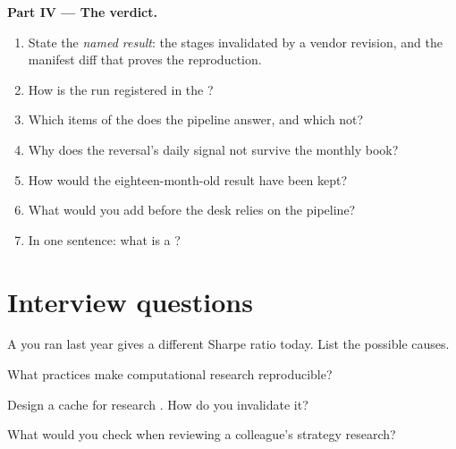 \begin{problem}
\medskip\noindent\textbf{Part IV --- The verdict.}
\begin{enumerate}[resume]
\item State the \emph{named result}: the stages invalidated by a vendor revision, and the manifest diff that proves the reproduction.
\item How is the run registered in the ?
\item Which items of the  does the pipeline answer, and which not?
\item Why does the reversal's daily signal not survive the monthly book?
\item How would the eighteen-month-old result have been kept?
\item What would you add before the desk relies on the pipeline?
\item In one sentence: what is a ?
\end{enumerate}
\end{problem}

\section{Interview questions}

\begin{interviewq}\label{iq:rs:build-a-research-workflow:1}
A  you ran last year gives a different Sharpe ratio today. List the possible causes.
\end{interviewq}

\begin{interviewq}\label{iq:rs:build-a-research-workflow:2}
What practices make computational research reproducible?
\end{interviewq}

\begin{interviewq}\label{iq:rs:build-a-research-workflow:3}
Design a cache for research . How do you invalidate it?
\end{interviewq}

\begin{interviewq}\label{iq:rs:build-a-research-workflow:4}
What would you check when reviewing a colleague's strategy research?
\end{interviewq}

